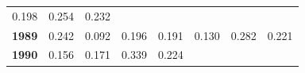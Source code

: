 \documentclass[]{article}
\begin{document}
\begin{longtable}[]{@{}rrrrrrrr@{}}
\begin{minipage}[t]{0.09\columnwidth}
0.198\strut
\end{minipage} & \begin{minipage}[t]{0.08\columnwidth}\raggedleft\strut
0.254\strut
\end{minipage} & \begin{minipage}[t]{0.10\columnwidth}\raggedleft\strut
0.232\strut
\end{minipage}\tabularnewline
\begin{minipage}[t]{0.08\columnwidth}\raggedleft\strut
\textbf{1989}\strut
\end{minipage} & \begin{minipage}[t]{0.10\columnwidth}\raggedleft\strut
0.242\strut
\end{minipage} & \begin{minipage}[t]{0.11\columnwidth}\raggedleft\strut
0.092\strut
\end{minipage} & \begin{minipage}[t]{0.08\columnwidth}\raggedleft\strut
0.196\strut
\end{minipage} & \begin{minipage}[t]{0.14\columnwidth}\raggedleft\strut
0.191\strut
\end{minipage} & \begin{minipage}[t]{0.09\columnwidth}\raggedleft\strut
0.130\strut
\end{minipage} & \begin{minipage}[t]{0.08\columnwidth}\raggedleft\strut
0.282\strut
\end{minipage} & \begin{minipage}[t]{0.10\columnwidth}\raggedleft\strut
0.221\strut
\end{minipage}\tabularnewline
\begin{minipage}[t]{0.08\columnwidth}\raggedleft\strut
\textbf{1990}\strut
\end{minipage} & \begin{minipage}[t]{0.10\columnwidth}\raggedleft\strut
0.156\strut
\end{minipage} & \begin{minipage}[t]{0.11\columnwidth}\raggedleft\strut
0.171\strut
\end{minipage} & \begin{minipage}[t]{0.08\columnwidth}\raggedleft\strut
0.339\strut
\end{minipage} & \begin{minipage}[t]{0.14\columnwidth}\raggedleft\strut
0.224\strut
\end{minipage} & \begin{minipage}[t]{0.09\columnwidth}\raggedleft\strut

\end{minipage}
\end{longtable}
\end{document}
